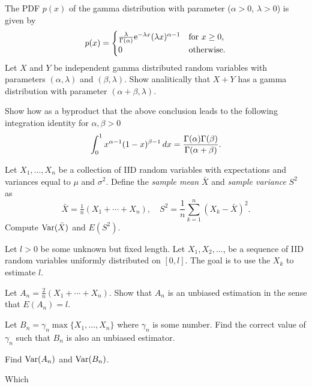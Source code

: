 \begin{problem}
  The PDF \(p(x)\) of the gamma distribution with parameter (\(\alpha>0\),
  \(\lambda>0\)) is given by
  \[
    p(x)=
    \begin{cases}
      \frac{\lambda}{\Gamma(\alpha)}\mathrm{e}^{-\lambda x}(\lambda x)^{\alpha
        -1}
      &\text{for \(x\geq 0\),}\\
      0&\text{otherwise.}
    \end{cases}
  \]
  Let \(X\) and \(Y\) be independent gamma distributed random variables
  with parameters \((\alpha,\lambda)\) and \((\beta,\lambda)\). Show
  analitically that \(X+Y\) has a gamma distribution with parameter
  \((\alpha+\beta,\lambda)\).

  Show how as a byproduct that the above conclusion leads to the following
  integration identity for \(\alpha,\beta>0\)
  \[
    \int_0^1 x^{\alpha-1}(1-x)^{\beta-1}\mathop{}\!d x
    =\frac{\Gamma(\alpha)\Gamma(\beta)}{\Gamma(\alpha+\beta)}.
  \]
\end{problem}
\begin{solution*}
\end{solution*}

\begin{problem}
  Let \(X_1,\dotsc,X_n\) be a collection of IID random variables with
  expectations and variances equal to \(\mu\) and \(\sigma^2\). Define the
  \emph{sample mean} \(\bar X\) and \emph{sample variance} \(S^2\) as
  \[
    \bar X=\tfrac{1}{n}(X_1+\dotsb+X_n),\quad
    S^2=\frac{1}{n}\sum_{k=1}^n(X_k-\bar X)^2.
  \]
  Compute \(\operatorname{Var}(\bar X)\) and \(E(S^2)\).
\end{problem}
\begin{solution*}
\end{solution*}

\begin{problem}
  Let \(l>0\) be some unknown but fixed length. Let \(X_1,X_2,\dotsc\), be
  a sequence of IID random variables uniformly distributed on
  \([0,l]\). The goal is to use the \(X_k\) to estimate \(l\).
  \begin{alphlist}
  \item Let \(A_n=\tfrac{2}{n}(X_1+\dotsb+X_n).\) Show that \(A_n\) is an
    unbiased estimation in the sense that \(E(A_n)=l\).
  \item Let \(B_n=\gamma_n\max\{X_1,\dotsc,X_n\}\) where \(\gamma_n\) is
    some number. Find the correct value of \(\gamma_n\) such that \(B_n\)
    is also an unbiased estimator.
  \item Find \(\operatorname{Var}(A_n)\) and \(\operatorname{Var}(B_n)\).
  \item Which
  \end{alphlist}
\end{problem}
\begin{solution*}
\end{solution*}

